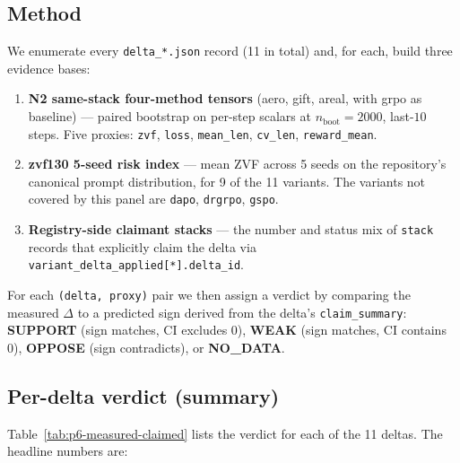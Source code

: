 \subsection{Method}
We enumerate every \texttt{delta\_*.json} record (11 in total) and, for
each, build three evidence bases:
\begin{enumerate}
  \item \textbf{N2 same-stack four-method tensors} (aero, gift, areal,
    with grpo as baseline) --- paired bootstrap on per-step scalars at
    $n_{\text{boot}}{=}2000$, last-$10$ steps. Five proxies:
    \texttt{zvf}, \texttt{loss}, \texttt{mean\_len}, \texttt{cv\_len},
    \texttt{reward\_mean}.
  \item \textbf{zvf130 5-seed risk index} --- mean ZVF across 5 seeds
    on the repository's canonical prompt distribution, for 9 of the 11
    variants. The variants not covered by this panel are
    \texttt{dapo}, \texttt{drgrpo}, \texttt{gspo}.
  \item \textbf{Registry-side claimant stacks} --- the number and status
    mix of \texttt{stack} records that explicitly claim the delta via
    \texttt{variant\_delta\_applied[*].delta\_id}.
\end{enumerate}
For each \texttt{(delta, proxy)} pair we then assign a verdict by
comparing the measured $\Delta$ to a predicted sign derived from the
delta's \texttt{claim\_summary}:
\textbf{SUPPORT} (sign matches, CI excludes 0), \textbf{WEAK} (sign
matches, CI contains 0), \textbf{OPPOSE} (sign contradicts), or
\textbf{NO\_DATA}.

\subsection{Per-delta verdict (summary)}
Table~\ref{tab:p6-measured-claimed} lists the verdict for each of the
11 deltas. The headline numbers are:

